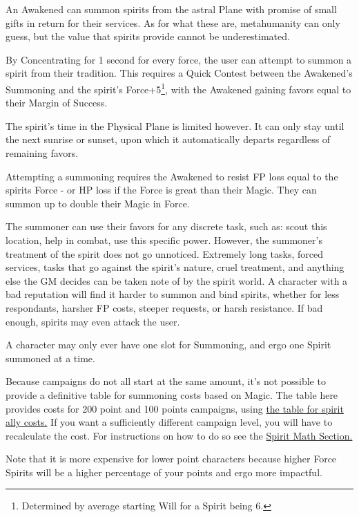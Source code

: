 \begin{multicols}{3}
	An Awakened can summon spirits from the astral Plane with promise of small gifts in return for their services. As for what these are, metahumanity can only guess, but the value that spirits provide cannot be underestimated.
	
	By Concentrating for 1 second for every force, the user can attempt to summon a spirit from their tradition. This requires a Quick Contest between the Awakened's Summoning and the spirit's Force+5\footnote{Determined by average starting Will for a Spirit being 6.}, with the Awakened gaining favors equal to their Margin of Success. 
	
	The spirit's time in the Physical Plane is limited however. It can only stay until the next sunrise or sunset, upon which it automatically departs regardless of remaining favors.
	
	Attempting a summoning requires the Awakened to resist FP loss equal to the spirits Force - or HP loss if the Force is great than their Magic. They can summon up to double their Magic in Force.
	
	The summoner can use their favors for any discrete task, such as: scout this location, help in combat, use this specific power. However, the summoner's treatment of the spirit does not go unnoticed. Extremely long tasks, forced services, tasks that go against the spirit's nature, cruel treatment, and anything else the GM decides can be taken note of by the spirit world. A character with a bad reputation will find it harder to summon and bind spirits, whether for less respondants, harsher FP costs, steeper requests, or harsh resistance. If bad enough, spirits may even attack the user.
	
	A character may only ever have one slot for Summoning, and ergo one Spirit summoned at a time.
	
	Because campaigns do not all start at the same amount, it's not possible to provide a definitive table for summoning costs based on Magic. The table here provides costs for 200 point and 100 points campaigns, using \hyperref[spirit_ally_cost]{the table for spirit ally costs.} If you want a sufficiently different campaign level, you will have to recalculate the cost. For instructions on how to do so see the \hyperref[spirit_math]{Spirit Math Section.} 
	
	Note that it is more expensive for lower point characters because higher Force Spirits will be a higher percentage of your points and ergo more impactful.
	

\end{multicols}
